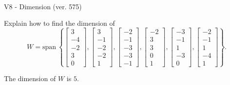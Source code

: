 \begin{exercise}
  \begin{exerciseTitle}V8 - Dimension (ver. 575)\end{exerciseTitle}
  \begin{exerciseStatement}
    Explain how to find the dimension of 
\[W=\mathrm{span}\ \left\{\left[\begin{array}{r}
3 \\
-4 \\
-2 \\
3 \\
0
\end{array}\right] , \left[\begin{array}{r}
3 \\
-1 \\
-2 \\
-2 \\
1
\end{array}\right] , \left[\begin{array}{r}
-2 \\
-1 \\
-3 \\
-3 \\
-1
\end{array}\right] , \left[\begin{array}{r}
-2 \\
3 \\
3 \\
0 \\
1
\end{array}\right] , \left[\begin{array}{r}
-3 \\
-1 \\
1 \\
-3 \\
0
\end{array}\right] , \left[\begin{array}{r}
-2 \\
-1 \\
1 \\
-4 \\
1
\end{array}\right]\right\}.\]



  \end{exerciseStatement}
  \begin{exerciseAnswer}
   The dimension of \(W\) is  \(5\).
  


  \end{exerciseAnswer}
\end{exercise}